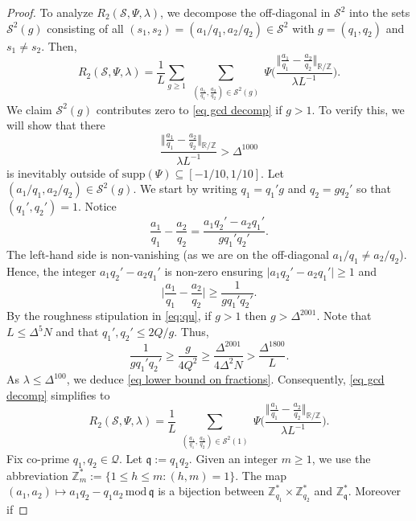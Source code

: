 \documentclass[12pt,reqno]{amsart}
\theoremstyle{plain}
\numberwithin{equation}{section}
\numberwithin{figure}{section}
\theoremstyle{plain}
\theoremstyle{definition}
\theoremstyle{remark}
\begin{document}
\begin{proof}
To analyze $R_2(\mathcal{S},\Psi,\lambda)$,
we decompose the off-diagonal in $\mathcal{S}^2$ 
into the sets $\mathcal{S}^2(g)$ consisting of all
$(s_1,s_2)=(a_1/q_1,a_2/q_2)\in  
\mathcal{S}^2$ with $g=(q_1,q_2)$ and $s_1\neq s_2$.
Then, 
\begin{equation}\label{eq gcd decomp}
R_2(\mathcal{S},\Psi,\lambda)
= 
\frac{1}{L} 
\sum_{g\geq 1} \sum_{\substack{(\frac{a_1}{q_1},
\frac{a_2}{q_2})\in \mathcal{S}^2(g)}} 
\Psi\Big(\frac{\Vert \frac{a_1}{q_1} - 
\frac{a_2}{q_2} \Vert_{\mathbb{R}/\mathbb{Z}}}
{\lambda L^{-1}}\Big).
\end{equation}
We claim $\mathcal{S}^2(g)$ contributes zero to \eqref{eq gcd decomp} if $g>1$. To verify this,
we will show that there
\begin{equation}\label{eq lower bound on fractions}
\frac{\Vert \frac{a_1}{q_1} - 
\frac{a_2}{q_2} \Vert_{\mathbb{R}/\mathbb{Z}}}
{\lambda L^{-1}} > \Delta^{1000}
\end{equation}
is inevitably outside of 
$\mathrm{supp}(\Psi)\subseteq [-1/10,1/10]$.
Let $(a_1/q_1,a_2/q_2)\in \mathcal{S}^2(g)$. We start 
by writing $q_1=q_1' g$ and $q_2=gq_2'$ so that $(q_1',q_2')=1$.
Notice
$$
\frac{a_1}{q_1} - 
\frac{a_2}{q_2}
= 
\frac{a_1q_2' - a_2 q_1'}{g q_1'q_2'}.
$$
The left-hand side is non-vanishing (as we
are on the off-diagonal $a_1/q_1\neq a_2/q_2$).
Hence, the integer $a_1q_2' - a_2 q_1'$ is non-zero
ensuring 
$\vert a_1q_2' - a_2 q_1'\vert \geq 1$ and
$$
\Big \vert 
\frac{a_1}{q_1} - 
\frac{a_2}{q_2}
\Big \vert \geq \frac{1}{g q_1'q_2'}.
$$
By the roughness stipulation in \eqref{eq:qu}, 
if $g>1$ then $g> \Delta^{2001}$.
Note that $L\leq \Delta^5 N$ and that $q_{1}', q_{2}' \leq 2 Q / g$.
Thus, 
$$
\frac{1}{g q_1'q_2'} \geq \frac{g}{4 Q^{2}} \geq \frac{\Delta^{2001}}{4 \Delta^{2} N}
> \frac{\Delta^{1800}}{L}.
$$
As $\lambda \leq \Delta^{100}$,
we deduce \eqref{eq lower bound on fractions}.
Consequently, \eqref{eq gcd decomp} simplifies to
$$
R_2(\mathcal{S},\Psi,\lambda)
= 
\frac{1}{L}  \sum_{\substack{(\frac{a_1}{q_1},
\frac{a_2}{q_2})\in \mathcal{S}^2(1)}} 
\Psi\Bigg(\frac{\big \Vert \frac{a_1}{q_1} - 
\frac{a_2}{q_2} \big\Vert_{\mathbb{R}/\mathbb{Z}}}
{\lambda L^{-1}}\Bigg).
$$
Fix co-prime
$q_1,q_2\in \mathcal{Q}$.
Let $\mathfrak{q}:=q_1q_2$.
Given an integer $m\geq 1$, we use the abbreviation $\mathbb{Z}_{m}^*:=\{1\leq h\leq m: (h,m)=1\}$.
The map
$(a_1,a_2)\mapsto a_1 q_2 - q_1 a_2 \,\mathrm{mod}\, \mathfrak{q}$
is a bijection 
between $\mathbb{Z}_{q_1}^*\times \mathbb{Z}_{q_2}^*$
and $\mathbb{Z}_{\mathfrak{q}}^*$. Moreover if 

\end{proof}
\end{document}
